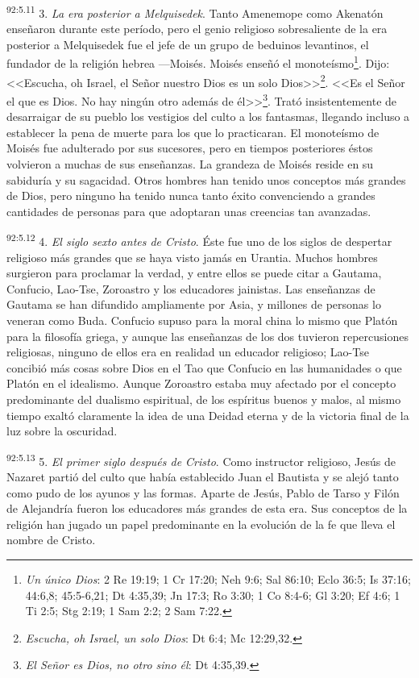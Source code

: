 \par
\textsuperscript{92:5.11} 3. \textit{La era posterior a Melquisedek}. Tanto Amenemope como Akenatón enseñaron durante este período, pero el genio religioso sobresaliente de la era posterior a Melquisedek fue el jefe de un grupo de beduinos levantinos, el fundador de la religión hebrea ---Moisés. Moisés enseñó el monoteísmo\footnote{\textit{Un único Dios}: 2 Re 19:19; 1 Cr 17:20; Neh 9:6; Sal 86:10; Eclo 36:5; Is 37:16; 44:6,8; 45:5-6,21; Dt 4:35,39; Jn 17:3; Ro 3:30; 1 Co 8:4-6; Gl 3:20; Ef 4:6; 1 Ti 2:5; Stg 2:19; 1 Sam 2:2; 2 Sam 7:22.}. Dijo: <<Escucha, oh Israel, el Señor nuestro Dios es un solo Dios>>\footnote{\textit{Escucha, oh Israel, un solo Dios}: Dt 6:4; Mc 12:29,32.}. <<Es el Señor el que es Dios. No hay ningún otro además de él>>\footnote{\textit{El Señor es Dios, no otro sino él}: Dt 4:35,39.}. Trató insistentemente de desarraigar de su pueblo los vestigios del culto a los fantasmas, llegando incluso a establecer la pena de muerte para los que lo practicaran. El monoteísmo de Moisés fue adulterado por sus sucesores, pero en tiempos posteriores éstos volvieron a muchas de sus enseñanzas. La grandeza de Moisés reside en su sabiduría y su sagacidad. Otros hombres han tenido unos conceptos más grandes de Dios, pero ninguno ha tenido nunca tanto éxito convenciendo a grandes cantidades de personas para que adoptaran unas creencias tan avanzadas.

\par
\textsuperscript{92:5.12} 4. \textit{El siglo sexto antes de Cristo}. Éste fue uno de los siglos de despertar religioso más grandes que se haya visto jamás en Urantia. Muchos hombres surgieron para proclamar la verdad, y entre ellos se puede citar a Gautama, Confucio, Lao-Tse, Zoroastro y los educadores jainistas. Las enseñanzas de Gautama se han difundido ampliamente por Asia, y millones de personas lo veneran como Buda. Confucio supuso para la moral china lo mismo que Platón para la filosofía griega, y aunque las enseñanzas de los dos tuvieron repercusiones religiosas, ninguno de ellos era en realidad un educador religioso; Lao-Tse concibió más cosas sobre Dios en el Tao que Confucio en las humanidades o que Platón en el idealismo. Aunque Zoroastro estaba muy afectado por el concepto predominante del dualismo espiritual, de los espíritus buenos y malos, al mismo tiempo exaltó claramente la idea de una Deidad eterna y de la victoria final de la luz sobre la oscuridad.

\par
\textsuperscript{92:5.13} 5. \textit{El primer siglo después de Cristo}. Como instructor religioso, Jesús de Nazaret partió del culto que había establecido Juan el Bautista y se alejó tanto como pudo de los ayunos y las formas. Aparte de Jesús, Pablo de Tarso y Filón de Alejandría fueron los educadores más grandes de esta era. Sus conceptos de la religión han jugado un papel predominante en la evolución de la fe que lleva el nombre de Cristo.


